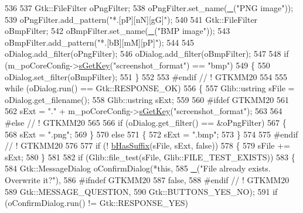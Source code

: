 \begin{DoxyCode}
536 
537   Gtk::FileFilter oPngFilter;
538   oPngFilter.set\_name(\mbox{\hyperlink{getopt_8c_a86a239addea586602343007a370bf8ad}{\_}}(\textcolor{stringliteral}{"PNG image"}));
539   oPngFilter.add\_pattern(\textcolor{stringliteral}{"*.[pP][nN][gG]"});
540 
541   Gtk::FileFilter oBmpFilter;
542   oBmpFilter.set\_name(\mbox{\hyperlink{getopt_8c_a86a239addea586602343007a370bf8ad}{\_}}(\textcolor{stringliteral}{"BMP image"}));
543   oBmpFilter.add\_pattern(\textcolor{stringliteral}{"*.[bB][mM][pP]"});
544 
545   oDialog.add\_filter(oPngFilter);
546   oDialog.add\_filter(oBmpFilter);
547 
548   \textcolor{keywordflow}{if} (m\_poCoreConfig->\mbox{\hyperlink{class_v_b_a_1_1_config_1_1_section_a7ac9dfabf38bc1db83a6017e130f04ac}{sGetKey}}(\textcolor{stringliteral}{"screenshot\_format"}) == \textcolor{stringliteral}{"bmp"})
549   \{
550     oDialog.set\_filter(oBmpFilter);
551   \}
552 
553 \textcolor{preprocessor}{#endif // ! GTKMM20}
554 
555   \textcolor{keywordflow}{while} (oDialog.run() == Gtk::RESPONSE\_OK)
556   \{
557     Glib::ustring sFile = oDialog.get\_filename();
558     Glib::ustring sExt;
559 
560 \textcolor{preprocessor}{#ifdef GTKMM20}
561 
562     sExt = \textcolor{stringliteral}{"."} + m\_poCoreConfig->\mbox{\hyperlink{class_v_b_a_1_1_config_1_1_section_a7ac9dfabf38bc1db83a6017e130f04ac}{sGetKey}}(\textcolor{stringliteral}{"screenshot\_format"});
563 
564 \textcolor{preprocessor}{#else // ! GTKMM20}
565 
566     \textcolor{keywordflow}{if} (oDialog.get\_filter() == &oPngFilter)
567     \{
568       sExt = \textcolor{stringliteral}{".png"};
569     \}
570     \textcolor{keywordflow}{else}
571     \{
572       sExt = \textcolor{stringliteral}{".bmp"};
573     \}
574 
575 \textcolor{preprocessor}{#endif // ! GTKMM20}
576 
577     \textcolor{keywordflow}{if} (! \mbox{\hyperlink{namespace_v_b_a_ad93561fe4528e04192e066e138c3572b}{bHasSuffix}}(sFile, sExt, \textcolor{keyword}{false}))
578     \{
579       sFile += sExt;
580     \}
581 
582     \textcolor{keywordflow}{if} (Glib::file\_test(sFile, Glib::FILE\_TEST\_EXISTS))
583     \{
584       Gtk::MessageDialog oConfirmDialog(*\textcolor{keyword}{this},
585                                         \mbox{\hyperlink{getopt_8c_a86a239addea586602343007a370bf8ad}{\_}}(\textcolor{stringliteral}{"File already exists. Overwrite it?"}),
586 #ifndef GTKMM20
587                                         \textcolor{keyword}{false},
588 #endif \textcolor{comment}{// ! GTKMM20}
589                                         Gtk::MESSAGE\_QUESTION,
590                                         Gtk::BUTTONS\_YES\_NO);
591       \textcolor{keywordflow}{if} (oConfirmDialog.run() != Gtk::RESPONSE\_YES)

\end{DoxyCode}
